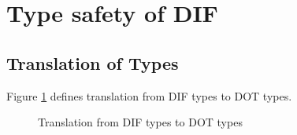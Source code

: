 \section{Type safety of DIF}

\subsection{Translation of Types}

\begin{DEFINITION}
    Figure \ref{translation} defines translation from DIF types to DOT types.
\end{DEFINITION}

\begin{figure}[h]
    
    \caption{Translation from DIF types to DOT types}
    \label{translation}
\end{figure}
